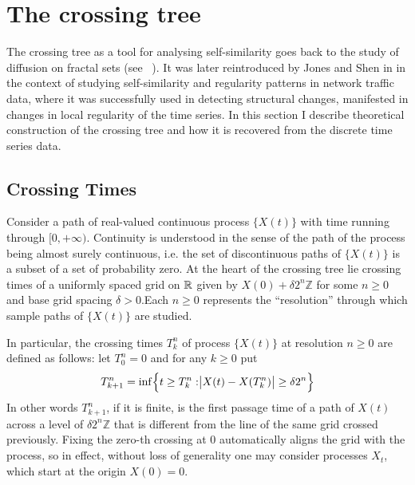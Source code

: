 \section{The crossing tree} %
\label{sec:the_crossing_tree}

The crossing tree as a tool for analysing self-similarity goes back to the study
of diffusion on fractal sets (see ~\cite{BarlowPerkins88}). It was later reintroduced
by Jones and Shen in \cite{jones2004} in the context of studying self-similarity
and regularity patterns in network traffic data, where it was successfully used in
detecting structural changes, manifested in changes in local regularity of the time
series. In this section I describe theoretical construction of the crossing tree
and how it is recovered from the discrete time series data.

\subsection{Crossing Times} %
\label{sub:crossing_times}

Consider a path of real-valued continuous process $\{X(t)\}$ with time running through
$[0,+\infty)$. Continuity is understood in the sense of the path of the process
being almost surely continuous, i.e. the set of discontinuous paths of $\{X(t)\}$
is a subset of a set of probability zero. At the heart of the crossing tree lie
crossing times of a uniformly spaced grid on $\mathbb{R}$ given by $X(0) + \delta 2^n \mathbb{Z}$
for some $n\geq 0$ and base grid spacing $\delta > 0$.\footnotemark Each $n\geq 0$
represents the ``resolution'' through which sample paths of $\{X(t)\}$ are studied.

In particular, the crossing times $T_k^n$ of process $\{X(t)\}$ at resolution $n\geq 0$
are defined as follows: let $T_0^n = 0$ and for any $k\geq 0$ put
\[
T_{k+1}^n
= \inf \Bigl\{ t \geq T^n_k : \bigr | X(t) - X(T^n_k) \bigr | \geq \delta 2^n \Bigr\}
\]
In other words $T_{k+1}^n$, if it is finite, is the first passage time of a path of
$X(t)$ across a level of $\delta 2^n \mathbb{Z}$ that is different from the line of
the same grid crossed previously. Fixing the zero-th crossing at $0$ automatically
aligns the grid with the process, so in effect, without loss of generality one may
consider processes $X_t$, which start at the origin $X(0)=0$.

